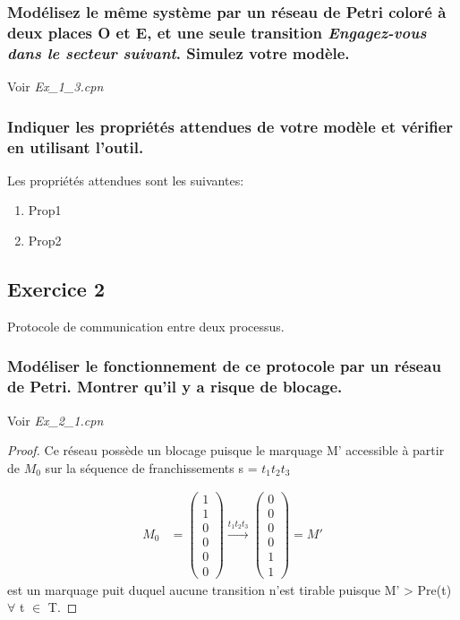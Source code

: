 \documentclass[french]{article}
\begin{document}
\subsubsection{Modélisez le même système par un réseau de Petri coloré à deux places O et E, et une seule transition 
\textit{Engagez-vous dans le secteur suivant}. Simulez votre modèle.}
Voir \textit{Ex\_1\_3.cpn}
\subsubsection{Indiquer les propriétés attendues de votre modèle et vérifier en utilisant l’outil.}
Les propriétés attendues sont les suivantes:
\begin{enumerate}
	\item Prop1
	\item Prop2
\end{enumerate}



\subsection{Exercice 2}
Protocole de communication entre deux processus.
\subsubsection{Modéliser le fonctionnement de ce protocole par un réseau de Petri. Montrer qu’il y a risque de 
blocage.}
Voir \textit{Ex\_2\_1.cpn}
\begin{proof}
Ce réseau possède un blocage puisque le marquage M' accessible à partir de $M_0$ sur la séquence de franchissements s = $t_1 
t_2 t_3$

\begin{align*}
M_0 &= \begin{pmatrix} 
	1 \\ 
	1 \\ 
	0 \\
	0 \\
	0 \\
	0   
\end{pmatrix} \xrightarrow{t_1 t_2 t_3} 
\begin{pmatrix} 
	0 \\ 
	0 \\ 
	0 \\
	0 \\
	1 \\
	1   
\end{pmatrix} = M'
\end{align*}
est un marquage puit duquel aucune transition n'est tirable puisque M' > Pre(t) $\forall$ t $\in$ T.
\end{proof}
\end{document}

